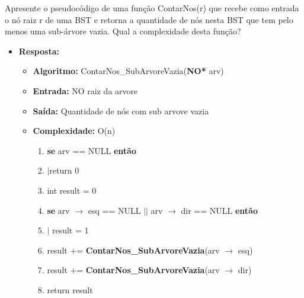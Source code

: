 Apresente o pseudocódigo de uma função ContarNos(r) que recebe como entrada o nó raiz
r de uma BST e retorna a quantidade de nós nesta BST que tem pelo menos uma sub-árvore
vazia. Qual a complexidade desta função?

\begin{itemize}
	\item \textbf{Resposta:}
	
	\begin{itemize}
		\item \textbf{Algoritmo:} ContarNos\_SubArvoreVazia(\textbf{NO*} arv)
		\item \textbf{Entrada:} NO raiz da arvore
		\item \textbf{Saída:}
		Quantidade de nós com sub arvove vazia
		\item \textbf{Complexidade:} O(n)
		
		\begin{enumerate}[1--]
			
			\item \textbf{se} arv == NULL \textbf{então}
			\item $|$\quad return 0
			\item int result = 0
			\item \textbf{se} arv $\rightarrow$ esq == NULL $||$ arv $\rightarrow$ dir == NULL \textbf{então}
			\item $|$ \quad result = 1
			\item result += \textbf{ContarNos\_SubArvoreVazia}(arv $\rightarrow$ esq)
			\item result += \textbf{ContarNos\_SubArvoreVazia}(arv $\rightarrow$ dir)
			\item return result
			
			
		\end{enumerate}
	\end{itemize}
\end{itemize}